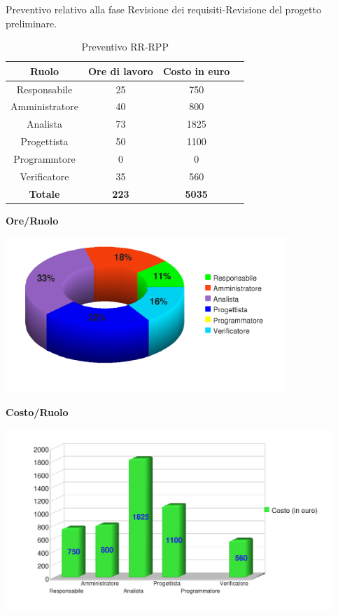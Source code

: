 Preventivo relativo alla fase Revisione dei requisiti-Revisione del progetto preliminare.
\begin{table}[h]
	\begin{center}
		  \begin{tabular}{|c|c|c|c|}
		 \hline 
		 \textbf{Ruolo} & \textbf{Ore di lavoro} & \textbf{Costo in euro}\\
		 \hline
		Responsabile & 25 & 750 \\
		Amministratore & 40 & 800\\
		Analista & 73 & 1825\\
		Progettista & 50 & 1100\\
		Programmtore & 0 & 0 \\
		Verificatore & 35 & 560\\
        \hline
        \textbf{Totale} & \textbf{223} & \textbf{5035}\\
		\hline
		\end{tabular}
	\caption{Preventivo RR-RPP} 
	\label{tab:tabella_RR-RPP}
	\end{center}	
\end{table}


\begin{center}\textbf{Ore/Ruolo}
\end{center}
\includegraphics[width=300pt]{RR-RPP_Ore}
\newpage
\begin{center}\textbf{Costo/Ruolo}
\end{center}
\includegraphics[width=350pt]{RR-RPP_Costi}


